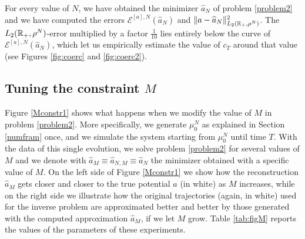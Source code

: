 For every value of $N$, we have obtained the minimizer $\widehat{a}_N$ of problem \eqref{problem2} and we have computed the errors $\mathcal{E}^{[a],N}(\widehat{a}_N)$ and $\|a-\widehat{a}_N\|^2_{L_2(\mathbb{R}_+,\rho^N)}$. The $L_2(\mathbb{R}_+,\rho^N)$-error multiplied by a factor $\frac{1}{10}$ lies entirely below the curve of $\mathcal{E}^{[a],N}(\widehat{a}_N)$, which let us empirically estimate the value of $c_T$ around that value (see Figures \ref{fig:coerc} and \ref{fig:coerc2}).
%

\subsection{Tuning the constraint $M$}

Figure \ref{Mconstr1} shows what happens when we modify the value of $M$ in problem \eqref{problem2}. More specifically, we generate $\mu^N_0$ as explained in Section \ref{numfram} once, and we simulate the system starting from $\mu^N_0$ until time $T$. With the data of this single evolution, we solve problem \eqref{problem2} for several values of $M$ and we denote with $\widehat{a}_M \equiv \widehat{a}_{N,M} \equiv \widehat{a}_{N}$ the minimizer obtained with a specific value of $M$. On the left side of Figure \ref{Mconstr1} we show how the reconstruction $\widehat{a}_M$ gets closer and closer to the true potential $a$ (in white) as $M$ increases, while on the right side we illustrate how the original trajectories (again, in white) used for the inverse problem are approximated better and better by those generated with the computed approximation $\widehat{a}_M$, if we let $M$ grow. Table \ref{tab:figM} reports the values of the parameters of these experiments.

